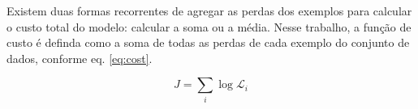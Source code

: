 Existem duas formas recorrentes de agregar as perdas dos exemplos para calcular o custo total do modelo: calcular a soma  ou a média. Nesse trabalho, a função de custo é definda como a soma de todas as perdas de cada exemplo do conjunto de dados, conforme eq. \eqref{eq:cost}.

\begin{equation}\label{eq:cost}
  J = \sum_i \log \mathcal{L}_i
\end{equation}







